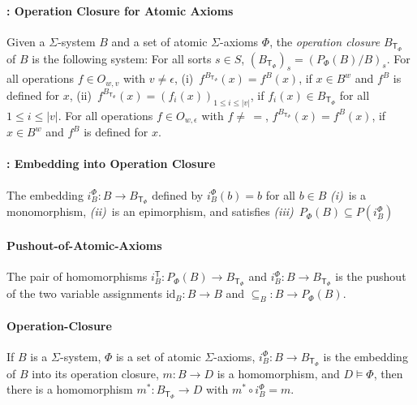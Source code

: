 \paragraph{: Operation Closure for Atomic
Axioms} Given a $\Sigma$-system $B$ and a set of atomic $\Sigma$-axioms
$\Phi$, the \emph{operation closure} $B_{\mathsf{T_{\Phi}}}$ of
$B$ is the following system: For all sorts $s\in S$, $\left(B_{\mathsf{T_{\Phi}}}\right)_{s}=\left(P_{\Phi}(B)/B\right)_{s}$.
For all operations $f\in O_{w,v}$ with $v\neq\epsilon$, (i)~$f^{B_{\mathsf{T_{\Phi}}}}(x)=f^{B}(x)$,
if $x\in B^{w}$ and $f^{B}$ is defined for $x$, (ii)~$f^{B_{\mathsf{T_{\Phi}}}}(x)=\left(f_{i}(x)\right)_{1\leq i\leq|v|}$,
if $f_{i}(x)\in B_{\mathsf{T_{\Phi}}}$ for all $1\leq i\leq|v|$.
For all operations $f\in O_{w,\epsilon}$ with $f\neq\,=$, $f^{B_{\mathsf{T_{\Phi}}}}(x)=f^{B}(x)$,
if $x\in B^{w}$ and $f^{B}$ is defined for $x$.



\paragraph{: Embedding into Operation
Closure} The embedding $i_{B}^{\Phi}:B\rightarrow B_{\mathsf{T_{\Phi}}}$
defined by $i_{B}^{\Phi}(b)=b$ for all $b\in B$ \emph{(i)}~is a
monomorphism, \emph{(ii)}~is an epimorphism, and satisfies \emph{(iii)}~$P_{\Phi}(B)\subseteq P\left(i_{B}^{\Phi}\right)$

\paragraph{ Pushout-of-Atomic-Axioms}The pair of homomorphisms $i_{B}^{\mathsf{T}}:P_{\Phi}(B)\rightarrow B_{\mathsf{T_{\Phi}}}$
and $i_{B}^{\Phi}:B\rightarrow B_{\mathsf{T_{\Phi}}}$ is the pushout
of the two variable assignments $\textrm{id}_{B}:B\rightarrow B$
and $\subseteq_{B}:B\rightarrow P_{\Phi}(B)$.


\paragraph{\lem Operation-Closure}If $B$ is a $\Sigma$-system, $\Phi$
is a set of atomic $\Sigma$-axioms, $i_{B}^{\Phi}:B\rightarrow B_{\mathsf{T_{\Phi}}}$
is the embedding of $B$ into its operation closure, $m:B\rightarrow D$
is a homomorphism, and $D\models\Phi$, then there is a homomorphism
$m^{*}:B_{\mathsf{T_{\Phi}}}\rightarrow D$ with $m^{*}\circ i_{B}^{\Phi}=m$.



